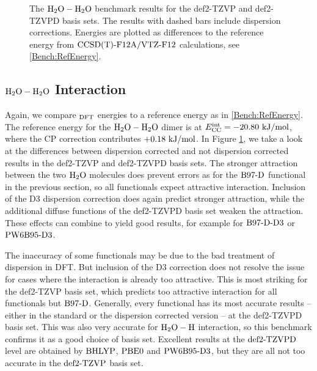 \documentclass[8.5pt,twoside,twocolumn]{article}
\newcommand\dft{\enmat{_{\te{DFT}}}}
\newcommand\kmo{\enmat{\te {kJ/mol}}}
\theoremstyle{standard}
\begin{document}
\begin{figure}[h]
\caption{The $\mbox{\ensuremath{\text H _2 \text O-\text H _2 \text O}}$ benchmark results for the def2-TZVP and def2-TZVPD basis sets.
The results with dashed bars include dispersion corrections. Energies are plotted as differences
to the reference energy from $\text{CCSD(T)-F12A}/\text{VTZ-F}12$ calculations, see \eqref{Bench:RefEnergy}.}
\label{Fig:Bench:H2O+H2O:TZVPCompare}
\end{figure}

\subsection{$\mbox{\ensuremath{\text H _2 \text O-\text H _2 \text O}}$ Interaction}

Again, we compare $\dft$ energies to a reference energy as in
\eqref{Bench:RefEnergy}. The reference energy for the $\mbox{\ensuremath{\text H _2 \text O-\text H _2 \text O}}$ dimer is at
\mbox{$\ecc=-20.80\ \kmo$}, where the CP correction contributes $+0.18\ \kmo$.
In Figure \ref{Fig:Bench:H2O+H2O:TZVPCompare}, we take a look at the differences between
dispersion corrected and not dispersion corrected results in the def2-TZVP and def2-TZVPD
basis sets. The stronger attraction between the two $\text H _2 \text O$ molecules does prevent
errors as for the $\text{B97-D}$ functional in the previous section, so all functionals
expect attractive interaction. Inclusion of the D3 dispersion correction does again
predict stronger attraction, while the additional diffuse functions of the
def2-TZVPD basis set weaken the attraction. These effects can combine to
yield good results, for example for $\text{B97-D}\text{-D3}$ or $\text{PW6B95}\text{-D3}$.

The inaccuracy of some functionals may be due to the bad treatment of
dispersion in DFT. But inclusion of the D3 correction does not resolve the issue for cases
where the interaction is already too attractive. This
is most striking for the def2-TZVP basis set, which predicts too attractive
interaction for all functionals but $\text{B97-D}$. Generally, every functional has its
most accurate results -- either in the standard or the dispersion corrected version --
at the def2-TZVPD basis set. This was also very accurate for $\mbox{\ensuremath{\text H _2 \text O-\text H}}$ interaction,
so this benchmark confirms it as a good choice of basis set. Excellent
results at the $\text{def2-TZVPD}$ level are obtained by $\text{BHLYP}$, $\text{PBE0}$ and $\text{PW6B95}\text{-D3}$,
but they are all not too accurate in the $\text{def2-TZVP}$ basis set.  
\end{document}
